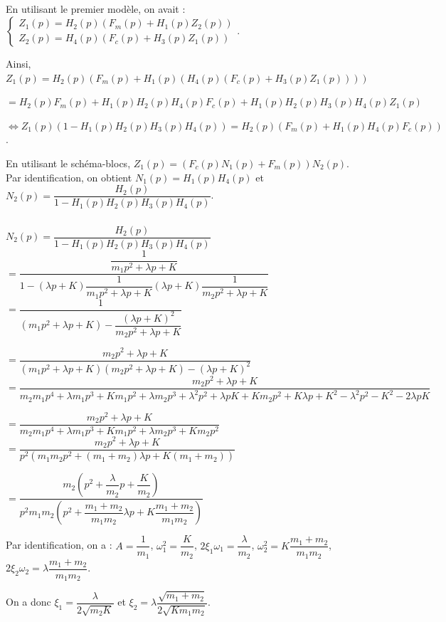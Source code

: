 \documentclass[10pt,fleqn]{article} %
\begin{document}
\subparagraph{}
En utilisant le premier modèle, on avait :
$
\left\{\begin{array}{l}
Z_1(p)=H_2(p)\left(F_m(p)+H_1(p)Z_2(p)\right) \\
Z_2(p)=H_4(p)\left(F_c(p)+H_3(p)Z_1(p)\right)
\end{array}
\right.
$. 

Ainsi, $Z_1(p)=H_2(p)\left(F_m(p)+H_1(p)\left( H_4(p)\left(F_c(p)+H_3(p)Z_1(p)\right)\right)\right) $

$=H_2(p)F_m(p)+H_1(p)H_2(p) H_4(p)F_c(p)+H_1(p)H_2(p) H_3(p)H_4(p)Z_1(p) $

$\Leftrightarrow Z_1(p)\left( 1-H_1(p)H_2(p) H_3(p)H_4(p)\right)=H_2(p)\left(F_m(p)+H_1(p)H_4(p)F_c(p)\right) $. 

En utilisant le schéma-blocs, $Z_1(p)=\left(F_c(p)N_1(p)+F_m(p)\right)N_2(p)$. 
Par identification, on obtient $N_1(p)=H_1(p)H_4(p)$ et $N_2(p)=\dfrac{H_2(p)}{1-H_1(p)H_2(p) H_3(p)H_4(p)}$.


\subparagraph{}

$N_2(p)=\dfrac{H_2(p)}{1-H_1(p)H_2(p) H_3(p)H_4(p)}$ 
$= \dfrac{\dfrac{1}{m_1p^2  + \lambda p+K}}{1-\left(\lambda p+K\right)\dfrac{1}{m_1p^2  + \lambda p+K} \left(\lambda p+K\right)\dfrac{1}{m_2p^2  + \lambda p+K}}$
$= \dfrac{1}{\left(m_1p^2  + \lambda p+K\right)- \dfrac{\left(\lambda p+K\right)^2}{m_2p^2  + \lambda p+K}}$

$= \dfrac{m_2p^2  + \lambda p+K}{\left(m_1p^2  + \lambda p+K\right)\left(m_2p^2  + \lambda p+K\right)- \left(\lambda p+K\right)^2}$
$= \dfrac{m_2p^2  + \lambda p+K}{
m_2m_1p^4  + \lambda m_1p^3+Km_1p^2+\lambda m_2p^3  + \lambda^2 p^2 +\lambda pK+Km_2p^2  + K\lambda p+K^2 - \lambda^2 p^2 -K^2 - 2\lambda p K}$

$= \dfrac{m_2p^2  + \lambda p+K}{
m_2m_1p^4  + \lambda m_1p^3+Km_1p^2+\lambda m_2p^3   +Km_2p^2 }$
$= \dfrac{m_2p^2  + \lambda p+K}{
p^2\left( m_1m_2p^2  + \left(m_1+ m_2\right) \lambda p  +K\left(m_1+m_2\right)\right) }$

$= \dfrac{m_2\left(p^2  + \dfrac{\lambda}{m_2}p+\dfrac{K}{m_2}\right)}{
p^2 m_1m_2 \left(p^2  + \dfrac{m_1+ m_2}{m_1m_2} \lambda p  +K\dfrac{m_1+m_2}{m_1m_2}\right) }$

Par identification, on a : $A=\dfrac{1}{m_1}$, $\omega_1^2=\dfrac{K}{m_2}$, $2\xi_1\omega_1=\dfrac{\lambda}{m_2}$, $\omega_2^2=K\dfrac{m_1+m_2}{m_1m_2}$, $2\xi_2\omega_2=\lambda\dfrac{m_1+ m_2}{m_1m_2}$. 

On a donc $\xi_1=\dfrac{\lambda}{2  \sqrt{m_2K}}$ et 
$\xi_2=\lambda\dfrac{\sqrt{m_1+ m_2}}{2\sqrt{Km_1m_2}}$.
\end{document}
